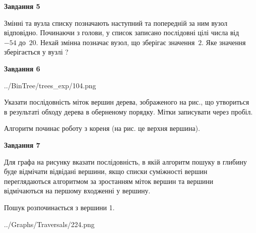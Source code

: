 \documentclass[12pt, ukrainian]{article}
\begin{document}
{\begin {large}
{\begin {center}\textbf{Завдання 5}\end {center}}\par
Змінні  та  вузла списку позначають наступний та попередній за ним вузол відповідно. Починаючи з голови, у список записано послідовні цілі числа від~$-54$ до~$20$. Нехай змінна  позначає вузол, що зберігає значення~$2$.
Яке значення зберігається у вузлі  ?\par
\newpage

{\begin {center}\textbf{Завдання 6}\end {center}}\par

\begin{center}
	{../BinTree/trees_exp/104.png}
\end{center}
Указати послідовність міток вершин дерева, зображеного на рис., що утвориться в результаті обходу дерева в оберненому порядку. Мітки записувати через пробіл.\par Алгоритм починає роботу з кореня (на рис. це верхня вершина).\par
\newpage

{\begin {center}\textbf{Завдання 7}\end {center}}\par
Для графа на рисунку вказати послідовність, в якій алгоритм пошуку в глибину буде відмічати відвідані вершини, якщо списки суміжності вершин переглядаються алгоритмом за зростанням міток вершин та вершини відмічаються на першому вход\-женні у вершину.\par
Пошук розпочинається з вершини 1.\par

\begin{center}
	{../Graphs/Traversals/224.png}
\end{center}\par
\newpage


\end{large}}
\end{document}
